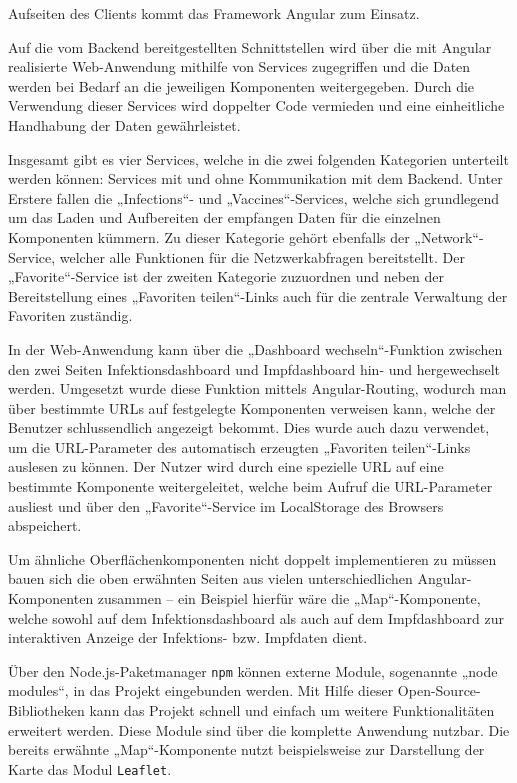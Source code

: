 \documentclass[conference]{IEEEtran}
\begin{document}
Aufseiten des Clients kommt das Framework Angular zum Einsatz.

Auf die vom Backend bereitgestellten Schnittstellen wird über die mit Angular realisierte Web-Anwendung mithilfe von Services zugegriffen und die Daten werden bei Bedarf an die jeweiligen Komponenten weitergegeben.
Durch die Verwendung dieser Services wird doppelter Code vermieden und eine einheitliche Handhabung der Daten gewährleistet.

Insgesamt gibt es vier Services, welche in die zwei folgenden Kategorien unterteilt werden können: Services mit und ohne Kommunikation mit dem Backend. Unter Erstere fallen die „Infections“- und „Vaccines“-Services, welche sich grundlegend um das Laden und Aufbereiten der empfangen Daten für die einzelnen Komponenten kümmern. Zu dieser Kategorie gehört ebenfalls der „Network“-Service, welcher alle Funktionen für die Netzwerkabfragen bereitstellt. Der „Favorite“-Service ist der zweiten Kategorie zuzuordnen und neben der Bereitstellung eines „Favoriten teilen“-Links auch für die zentrale Verwaltung der Favoriten zuständig.

In der Web-Anwendung kann über die „Dashboard wechseln“-Funktion zwischen den zwei Seiten Infektions\-dashboard und Impfdashboard hin- und hergewechselt werden. Umgesetzt wurde diese Funktion mittels Angular-Routing, wodurch man über bestimmte URLs auf festgelegte Komponenten verweisen kann, welche der Benutzer schlussendlich angezeigt bekommt. Dies wurde auch dazu verwendet, um die URL-Parameter des automatisch erzeugten „Favoriten teilen“-Links auslesen zu können. Der Nutzer wird durch eine spezielle URL auf eine bestimmte Komponente weitergeleitet, welche beim Aufruf die URL-Parameter ausliest und über den „Favorite“-Service im LocalStorage des Browsers abspeichert.

Um ähnliche Oberflächenkomponenten nicht doppelt implementieren zu müssen bauen sich die oben erwähnten Seiten aus vielen unterschiedlichen Angular-Komponenten zusammen -- ein Beispiel hierfür wäre die „Map“-Komponente, welche sowohl auf dem Infektionsdashboard als auch auf dem Impfdashboard zur interaktiven Anzeige der Infektions- bzw. Impfdaten dient.

Über den Node.js-Paketmanager \texttt{npm}\cite{npm} können externe Module, sogenannte „node modules“, in das Projekt eingebunden werden. Mit Hilfe dieser Open-Source-Bibliotheken kann das Projekt schnell und einfach um weitere Funktionalitäten erweitert werden. Diese Module sind über die komplette Anwendung nutzbar. Die bereits erwähnte „Map“-Komponente nutzt beispielsweise zur Darstellung der Karte das Modul \texttt{Leaflet}\cite{Leaflet}.
\end{document}

